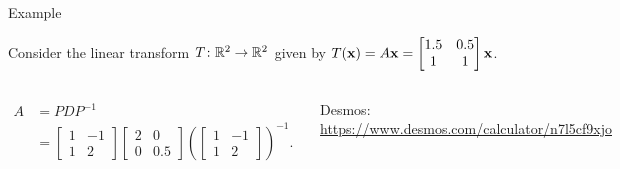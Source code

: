 \documentclass[xcolor=dvipsnames,aspectratio=169,t]{beamer}
\begin{document}
\begin{frame}{Example}
  \bigskip
  
  Consider the linear transform $T\colon\mathbb{R}^2\to\mathbb{R}^2$ given by 
  $T(\mathbf{x})=A\mathbf{x}=\begin{bmatrix} 1.5 & 0.5 \\ 1 & 1 \end{bmatrix}\mathbf{x}$.
  \bigskip
  
  \begin{columns}[T]
  \begin{align*}
    A&=PDP^{-1} \\
    &=
    \begin{bmatrix} 1 & -1\\1 & 2\end{bmatrix}
    \begin{bmatrix}2 & 0\\0 & 0.5\end{bmatrix}
    \left( \begin{bmatrix} 1 & -1\\1 & 2\end{bmatrix} \right)^{-1}.
  \end{align*}
  \smallskip
  
  {\small
  Desmos: \url{https://www.desmos.com/calculator/n7l5cf9xjo}
  }

  \pause
  \includegraphics[scale=.25]{images/desmos-eigenvalues_linear_transformation.pdf}
  \end{columns}
\end{frame}
\end{document}
